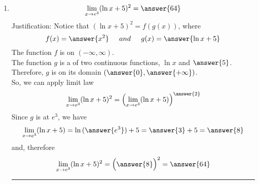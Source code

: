 \documentclass{ximera}
\begin{document}
\begin{exercise}
\begin{enumerate}
\noindent\rule[0.5ex]{\linewidth}{.2pt}
\item
 \[
\lim_{x\to e^{3}}(\ln{x}+5)^{2} = \answer{64}
\] 
Justification: Notice that $(\ln{x}+5)^{2} =f(g(x)) $, where
\[
 f(x)=\answer{x^{2}} \hspace{0.2in}and \hspace{0.2in} g(x)=\answer{\ln{x}+5}
\] 
The function $f$ is   on $ (-\infty,\infty)$.\\
The function $g$ is a   of two continuous functions, $\ln{x}$ and $ \answer{5}$.
Therefore, $g$ is   on its domain $(\answer{0},\answer{+\infty})$.\\
So, we can apply
  limit law 
 \[
\lim_{x\to e^{3}}(\ln{x}+5)^{2} =\Bigl(\lim_{x\to e^{3}}(\ln{x}+5)\Bigr)^{\answer{2}} 
\] 
Since $g$ is   at $e^{3}$, we have
 \[
\lim_{x\to e^{3}}(\ln{x}+5)=\ln{(\answer{e^{3}})}+5=\answer{3}+5=\answer{8}
\] 
and, therefore
\[
\lim_{x\to e^{3}}(\ln{x}+5)^{2} = \Bigl(\answer{8}\Bigr)^{2} =\answer{64}
\] 
\noindent\rule[0.5ex]{\linewidth}{.2pt}
\end{enumerate}
\end{exercise}
\end{document}
